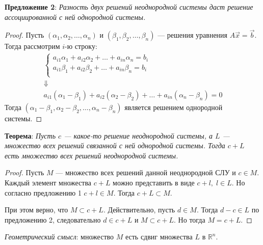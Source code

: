 \documentclass[a4paper, 12pt]{article}
\begin{document}
\textbf{Предложение 2}: \textit{Разность двух решений неоднородной системы даст решение ассоциированной с ней однородной системы.}
\begin{proof}
Пусть $(\alpha_1, \alpha_2, \ldots, \alpha_n)$ и $(\beta_1, \beta_2, \ldots, \beta_n)$ --- решения уравнения $A\vec{x} = \vec{b}$. Тогда рассмотрим $i$-ю строку:
\begin{gather*}
\begin{cases}
a_{i1}\alpha_1 + a_{i2}\alpha_2 + \ldots + a_{in}\alpha_n = b_i \\
a_{i1}\beta_1 + a_{i2}\beta_2 + \ldots + a_{in}\beta_n = b_i \\
\end{cases}\\
\Downarrow\\
a_{i1}(\alpha_1 - \beta_1) + a_{i2}(\alpha_2 - \beta_2) + \ldots + a_{in}(\alpha_n - \beta_n) = 0
\end{gather*}
Тогда $(\alpha_1 - \beta_1, \alpha_2 - \beta_2, \ldots, \alpha_n - \beta_n)$ является решением однородной системы.
\end{proof}

\textbf{Теорема}: \textit{Пусть $c$ --- какое-то решение неоднородной системы, а $L$ --- множество всех решений связанной с ней однородной системы. Тогда $c + L$ есть множество всех решений неоднородной системы.}
\begin{proof}
Пусть $M$ --- множество всех решений данной неоднородной СЛУ и ${c \in M}$. Каждый элемент множества $c + L$ можно представить в виде $c + l,\; l \in L$. Но согласно предложению 1 $c + l \in M$. Тогда $c + L \subset M$.

При этом верно, что $M \subset c + L$. Действительно, пусть $d \in M$. Тогда $d - c \in L$ по предложению 2, следовательно $d \in c + L$ и $M \subset c + L$. Но тогда $M = c + L$.
\end{proof}

\textit{Геометрический смысл}: множество $M$ есть сдвиг множества $L$ в $\mathbb{R}^n$.

\end{document}
